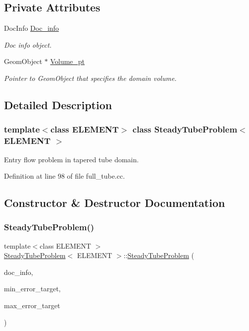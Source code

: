 \subsection*{Private Attributes}
\begin{DoxyCompactItemize}
\item 
Doc\+Info \hyperlink{classSteadyTubeProblem_a2d535b7b21eb6383b9f3c9f4c3ce4510}{Doc\+\_\+info}
\begin{DoxyCompactList}\small\item\em Doc info object. \end{DoxyCompactList}\item 
Geom\+Object $\ast$ \hyperlink{classSteadyTubeProblem_aedad3a2d2afd1f1c306dae289b3c2baf}{Volume\+\_\+pt}
\begin{DoxyCompactList}\small\item\em Pointer to Geom\+Object that specifies the domain volume. \end{DoxyCompactList}\end{DoxyCompactItemize}


\subsection{Detailed Description}
\subsubsection*{template$<$class E\+L\+E\+M\+E\+NT$>$\newline
class Steady\+Tube\+Problem$<$ E\+L\+E\+M\+E\+N\+T $>$}

Entry flow problem in tapered tube domain. 

Definition at line 98 of file full\+\_\+tube.\+cc.



\subsection{Constructor \& Destructor Documentation}
\mbox{\label{classSteadyTubeProblem_a333c59fbeb36a2a5cbb170fc34783ec4}} 
\subsubsection{\texorpdfstring{Steady\+Tube\+Problem()}{SteadyTubeProblem()}}
{\footnotesize\ttfamily template$<$class E\+L\+E\+M\+E\+NT $>$ \\
\hyperlink{classSteadyTubeProblem}{Steady\+Tube\+Problem}$<$ E\+L\+E\+M\+E\+NT $>$\+::\hyperlink{classSteadyTubeProblem}{Steady\+Tube\+Problem} (\begin{DoxyParamCaption}\item[{Doc\+Info \&}]{doc\+\_\+info,  }\item[{const double \&}]{min\+\_\+error\+\_\+target,  }\item[{const double \&}]{max\+\_\+error\+\_\+target }\end{DoxyParamCaption})}



